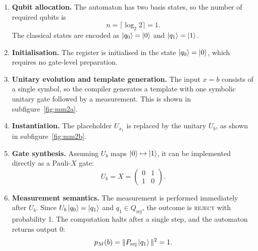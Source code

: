 \begin{enumerate}
  \item \textbf{Qubit allocation.} The automaton has two basis states, so the number of required qubits is
  \[
  n = \lceil \log_2 2 \rceil = 1.
  \]
  The classical states are encoded as $\ket{q_0} = \ket{0}$ and $\ket{q_1} = \ket{1}$.

  \item \textbf{Initialisation.} The register is initialised in the state $\ket{q_0} = \ket{0}$, which requires no gate-level preparation.

  \item \textbf{Unitary evolution and template generation.} The input $x = b$ consists of a single symbol, so the compiler generates a template with one symbolic unitary gate followed by a measurement. This is shown in subfigure~\ref{fig:mm2a}.

  \item \textbf{Instantiation.} The placeholder $U_{x_1}$ is replaced by the unitary $U_b$, as shown in subfigure~\ref{fig:mm2b}.

  \item \textbf{Gate synthesis.} Assuming $U_b$ maps $\ket{0} \mapsto \ket{1}$, it can be implemented directly as a Pauli-$X$ gate:
  \[
  U_b = X = 
  \begin{pmatrix}
  0 & 1 \\
  1 & 0
  \end{pmatrix}.
  \]

  \item \textbf{Measurement semantics.} The measurement is performed immediately after $U_b$. Since $U_b \ket{q_0} = \ket{q_1}$ and $q_1 \in Q_{\text{rej}}$, the outcome is \textsc{reject} with probability 1. The computation halts after a single step, and the automaton returns output $0$:
  \[
  p_M(b) = \|P_{\text{rej}} \ket{q_1}\|^2 = 1.
  \]
\end{enumerate}

